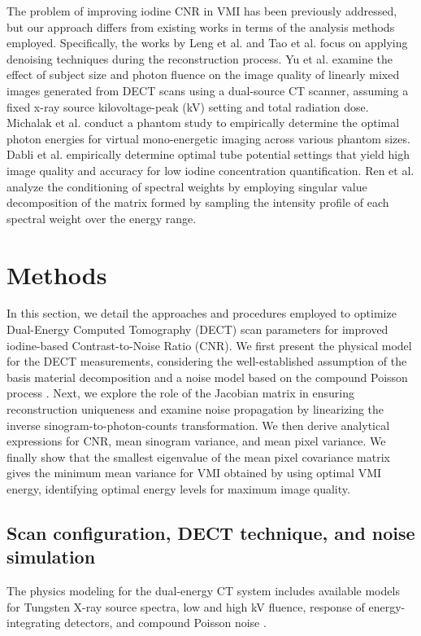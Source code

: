 \documentclass[12pt,twoside]{article}   %
\begin{document}
The problem of improving iodine CNR in VMI has been previously addressed, but our approach differs from existing works in terms of the analysis methods employed. Specifically, the works by Leng et al. \cite{Leng2015} and Tao et al. \cite{Tao2019} focus on applying denoising techniques during the reconstruction process. Yu et al. \cite{Yu2009, Yu2011} examine the effect of subject size and photon fluence on the image quality of linearly mixed images generated from DECT scans using a dual-source CT scanner, assuming a fixed x-ray source kilovoltage-peak (kV) setting and total radiation dose. Michalak et al. \cite{Michalak2017} conduct a phantom study to empirically determine the optimal photon energies for virtual mono-energetic imaging across various phantom sizes. Dabli et al. \cite{Dabli2021} empirically determine optimal tube potential settings that yield high image quality and accuracy for low iodine concentration quantification. Ren et al. \cite{Ren2021} analyze the conditioning of spectral weights by employing singular value decomposition of the matrix formed by sampling the intensity profile of each spectral weight over the energy range.

\section{Methods}\label{sec:methods}
In this section, we detail the approaches and procedures employed to optimize Dual-Energy Computed Tomography (DECT) scan parameters for improved iodine-based Contrast-to-Noise Ratio (CNR). We first present the physical model for the DECT measurements, considering the well-established assumption of the basis material decomposition \cite{AlvarezMacovski, Williamson2006} and a noise model based on the compound Poisson process \cite{Whiting2002}. Next, we explore the role of the Jacobian matrix in ensuring reconstruction uniqueness and examine noise propagation by linearizing the inverse sinogram-to-photon-counts transformation. We then derive analytical expressions for CNR, mean sinogram variance, and mean pixel variance. We finally show that the smallest eigenvalue of the mean pixel covariance matrix gives the minimum mean variance for VMI obtained by using optimal VMI energy, identifying optimal energy levels for maximum image quality.

\subsection{Scan configuration, DECT technique, and noise simulation}
The physics modeling for the dual-energy CT system includes available models for Tungsten X-ray source spectra, low and high kV fluence, response of energy-integrating detectors, and compound Poisson noise \cite{Whiting2002}. 
\end{document}
